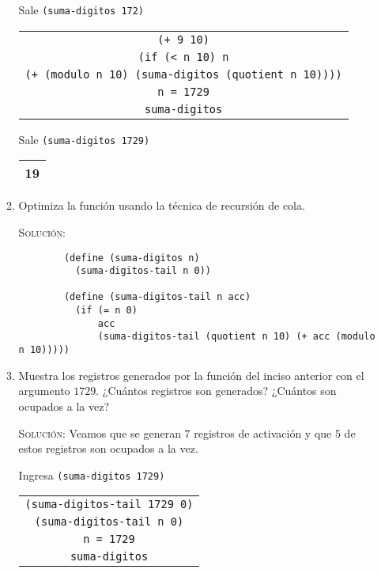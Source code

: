 \documentclass[letterpaper,11pt]{article}
\begin{document}
\begin{enumerate}
\begin{enumerate}
        Sale \texttt{(suma-digitos 172)}
        \begin{center}
            \begin{tabular}[h]{|c|}
                \hline
                \texttt{(+ 9 10)} \\
                \texttt{(if (< n 10) n} \\
                \texttt{(+ (modulo n 10) (suma-digitos (quotient n 10))))} \\ 
                \texttt{n = 1729} \\
                \texttt{suma-digitos} \\
                \hline
            \end{tabular}
        \end{center}

        Sale \texttt{(suma-digitos 1729)}
        \begin{center}
            \begin{tabular}[h]{|c|}
                \hline
                19 \\
                \hline
            \end{tabular}
        \end{center}

        \item Optimiza la función usando la técnica de recursión de cola.

        \textsc{Solución:}
        \begin{verbatim}
        (define (suma-digitos n)
          (suma-digitos-tail n 0))

        (define (suma-digitos-tail n acc)
          (if (= n 0)
              acc
              (suma-digitos-tail (quotient n 10) (+ acc (modulo n 10)))))
        \end{verbatim}

        \newpage
        \item Muestra los registros generados por la función del inciso anterior 
        con el argumento $1729$. ¿Cuántos registros son generados? ¿Cuántos son 
        ocupados a la vez?

        \textsc{Solución:} Veamos que se generan $7$ registros de activación 
        y que $5$ de estos registros son ocupados a la vez.

        Ingresa \texttt{(suma-digitos 1729)}
        \begin{center}
            \begin{tabular}[h]{|c|}
                \hline
                \texttt{(suma-digitos-tail 1729 0)} \\
                \texttt{(suma-digitos-tail n 0)} \\
                \texttt{n = 1729} \\
                \texttt{suma-digitos} \\
                \hline
            \end{tabular}
        \end{center}


\end{enumerate}
\end{enumerate}
\end{document}
